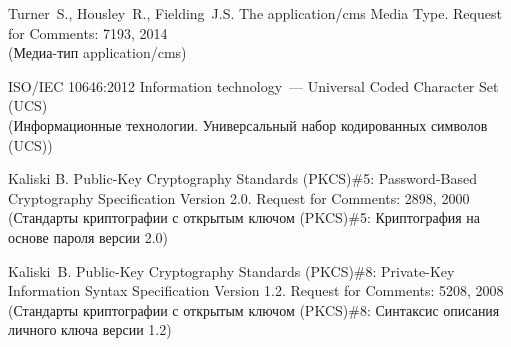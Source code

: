\begin{thebibliography}{9}
Turner~S., Housley~R., Fielding~J.S.  
The application/cms Media Type. 
Request for Comments: 7193, 2014\\ 
{\small (Медиа-тип application/cms)}
\fi

ISO/IEC 10646:2012 Information technology~--- Universal Coded Character 
Set (UCS)\\
{\small (Информационные технологии. Универсальный набор кодированных 
символов (UCS))}

Kaliski B. 
Public-Key Cryptography Standards (PKCS)\#5: 
Password-Based Cryptography Specification Version 2.0. 
Request for Comments: 2898, 2000\\ 
{\small (Стандарты криптографии с открытым ключом (PKCS)\#5: 
Криптография на основе пароля версии 2.0)}  

Kaliski~B. 
Public-Key Cryptography Standards (PKCS)\#8: 
Private-Key Information Syntax Specification Version 1.2. 
Request for Comments: 5208, 2008\\ 
{\small (Стандарты криптографии с открытым ключом (PKCS)\#8: 
Синтаксис описания личного ключа версии 1.2)}  
\label{LastBib}
\end{thebibliography}

